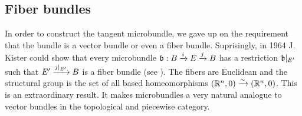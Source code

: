 \subsection*{Fiber bundles}
\begin{myparagraph}
    In order to construct the tangent microbundle, we gave up on the requirement that the bundle is a vector bundle or even a fiber bundle. Suprisingly, in 1964 J. Kister could show that every microbundle $\bundledef{\bb}{B}{E}{i}{j}$ has a restriction $\bb[E']$ such that $E' \xrightarrow{j\vert_{E'}} B$ is a fiber bundle (see \cite{kister}). The fibers are Euclidean and the structural group is the set of all based homeomorphisms $(\mathbb{R}^n, 0) \xrightarrow{\sim} (\mathbb{R}^n, 0)$. This is an extraordinary result. It makes microbundles a very natural analogue to vector bundles in the topological and piecewise category.
\end{myparagraph}